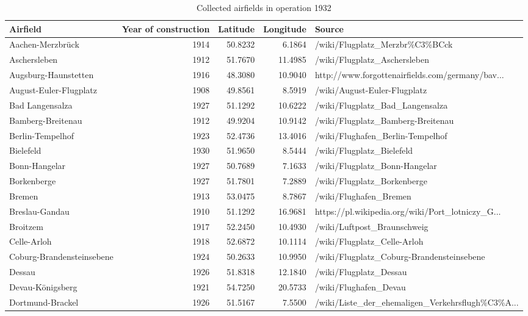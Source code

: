\begin{table}[h!]
\centering
\caption{Collected airfields in operation 1932\label{tab:airfields}} 
{\tiny
\begin{tabular}{p{2.8cm}rrrp{6cm}}
  \toprule
Airfield & Year of construction & Latitude & Longitude & Source \\ 
  \midrule
Aachen-Merzbr\"uck & 1914 & 50.8232 & 6.1864 & /wiki/Flugplatz\_Merzbr\%C3\%BCck \\ 
  Aschersleben & 1912 & 51.7670 & 11.4985 & /wiki/Flugplatz\_Aschersleben \\ 
  Augsburg-Haunstetten & 1916 & 48.3080 & 10.9040 & http://www.forgottenairfields.com/germany/bav... \\ 
  August-Euler-Flugplatz & 1908 & 49.8561 & 8.5919 & /wiki/August-Euler-Flugplatz \\ 
  Bad Langensalza & 1927 & 51.1292 & 10.6222 & /wiki/Flugplatz\_Bad\_Langensalza \\ 
  Bamberg-Breitenau & 1912 & 49.9204 & 10.9142 & /wiki/Flugplatz\_Bamberg-Breitenau \\ 
  Berlin-Tempelhof & 1923 & 52.4736 & 13.4016 & /wiki/Flughafen\_Berlin-Tempelhof \\ 
  Bielefeld & 1930 & 51.9650 & 8.5444 & /wiki/Flugplatz\_Bielefeld \\ 
  Bonn-Hangelar & 1927 & 50.7689 & 7.1633 & /wiki/Flugplatz\_Bonn-Hangelar \\ 
  Borkenberge & 1927 & 51.7801 & 7.2889 & /wiki/Flugplatz\_Borkenberge \\ 
   \midrule
Bremen  & 1913 & 53.0475 & 8.7867 & /wiki/Flughafen\_Bremen \\ 
  Breslau-Gandau & 1910 & 51.1292 & 16.9681 & https://pl.wikipedia.org/wiki/Port\_lotniczy\_G... \\ 
  Broitzem & 1917 & 52.2450 & 10.4930 & /wiki/Luftpost\_Braunschweig \\ 
  Celle-Arloh & 1918 & 52.6872 & 10.1114 & /wiki/Flugplatz\_Celle-Arloh \\ 
  Coburg-Brandensteinsebene & 1924 & 50.2633 & 10.9950 & /wiki/Flugplatz\_Coburg-Brandensteinsebene \\ 
  Dessau & 1926 & 51.8318 & 12.1840 & /wiki/Flugplatz\_Dessau \\ 
  Devau-K\"onigsberg & 1921 & 54.7250 & 20.5733 & /wiki/Flughafen\_Devau \\ 
  Dortmund-Brackel & 1926 & 51.5167 & 7.5500 & /wiki/Liste\_der\_ehemaligen\_Verkehrsflugh\%C3\%A... \\ 

\end{tabular}}
\end{table}
